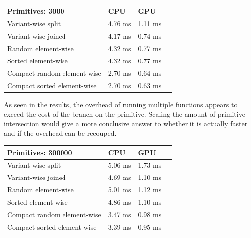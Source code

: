 \documentclass{article}
\begin{document}
\begin{center}
    \begin{tabular}{ | m{14em} | m{8em}| m{8em} | m{8em} | } 
      \hline
      {\bf Primitives: 3000} & {\bf CPU} & {\bf GPU} \\ 
      \hline
      Variant-wise split          & 4.76 ms & 1.11 ms\\ 
      \hline
      Variant-wise joined         & 4.17 ms & 0.74 ms\\ 
      \hline
      Random element-wise         & 4.32 ms & 0.77 ms\\ 
      \hline
      Sorted element-wise         & 4.32 ms & 0.77 ms\\ 
      \hline
      Compact random element-wise & 2.70 ms & 0.64 ms\\ 
      \hline
      Compact sorted element-wise & 2.70 ms & 0.63 ms\\ 
      \hline
    \end{tabular}
\end{center}

As seen in the results, the overhead of running multiple functions appears to exceed the cost of the branch on the primitive.
Scaling the amount of primitive intersection would give a more conclusive answer to whether it is actually faster and if the overhead can be recouped.  

\begin{center}
    \begin{tabular}{ | m{14em} | m{8em}| m{8em} | m{8em} | } 
      \hline
      {\bf Primitives: 300000} & {\bf CPU} & {\bf GPU} \\ 
      \hline
      Variant-wise split          & 5.06 ms & 1.73 ms\\ 
      \hline
      Variant-wise joined         & 4.69 ms & 1.10 ms\\ 
      \hline
      Random element-wise         & 5.01 ms & 1.12 ms\\ 
      \hline
      Sorted element-wise         & 4.86 ms & 1.10 ms\\ 
      \hline
      Compact random element-wise & 3.47 ms & 0.98 ms\\ 
      \hline
      Compact sorted element-wise & 3.39 ms & 0.95 ms\\ 
      \hline
    \end{tabular}
\end{center}
\end{document}
